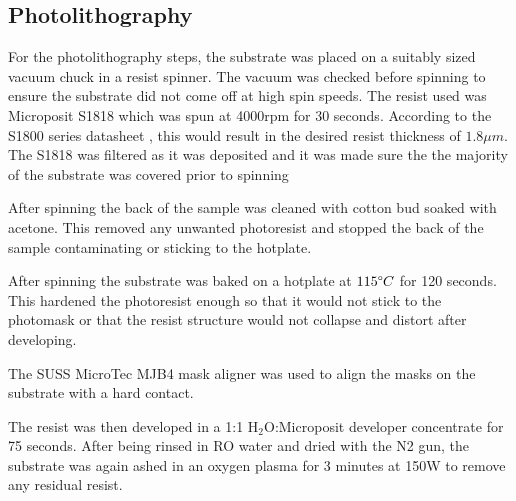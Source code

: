 \subsection{Photolithography}
\label{sec:fab:photolithography}


For the photolithography steps, the substrate was placed on a suitably sized vacuum chuck in a resist spinner. The vacuum was checked before spinning to ensure the substrate did not come off at high spin speeds. The resist used was Microposit S1818 which was spun at 4000rpm for 30 seconds. According to the S1800 series datasheet \cite{s18}, this would result in the desired resist thickness of $1.8\mu m$. The S1818 was filtered as it was deposited and it was made sure the the majority of the substrate was covered prior to spinning

After spinning the back of the sample was cleaned with cotton bud soaked with acetone. This removed any unwanted photoresist and stopped the back of the sample contaminating or sticking to the hotplate.

After spinning the substrate was baked on a hotplate at $115\degree C$ for 120 seconds. This hardened the photoresist enough so that it would not stick to the photomask or that the resist structure would not collapse and distort after developing.

The SUSS MicroTec MJB4 mask aligner was used to align the masks on the substrate with a hard contact. %

The resist was then developed in a 1:1 H$_2$O:Microposit developer concentrate for 75 seconds. After being rinsed in RO water and dried with the N2 gun, the substrate was again ashed in an oxygen plasma for 3 minutes at 150W to remove any residual resist.
